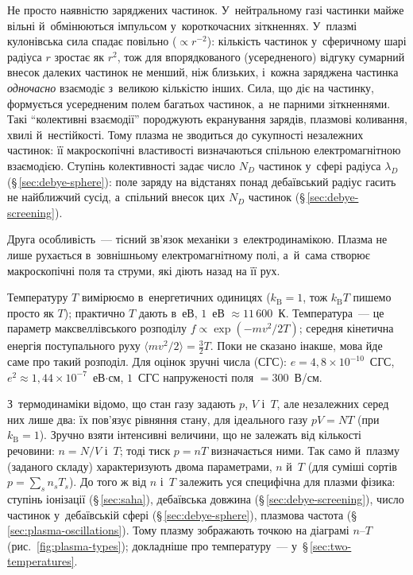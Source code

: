  Не просто наявністю заряджених
частинок. У~нейтральному газі частинки майже вільні й~обмінюються імпульсом
у~короткочасних зіткненнях. У~плазмі кулонівська сила спадає повільно ($\propto r^{-2}$): кількість частинок у~сферичному шарі
радіуса $r$ зростає як $r^2$, тож для впорядкованого (усередненого) відгуку сумарний внесок далеких частинок не менший, ніж близьких,
і~кожна заряджена частинка \emph{одночасно} взаємодіє з~великою кількістю інших. Сила,
що діє на частинку, формується усередненим полем багатьох частинок, а~не парними
зіткненнями. Такі \enquote{колективні взаємодії} породжують екранування зарядів, плазмові
коливання, хвилі й~нестійкості. Тому плазма не зводиться до сукупності незалежних
частинок: її макроскопічні властивості визначаються спільною електромагнітною взаємодією.
Ступінь колективності задає число $N_D$ частинок у~сфері радіуса $\lambda_D$
(§\,\ref{sec:debye-sphere}): поле заряду на відстанях понад дебаївський радіус гасить не найближчий
сусід, а~спільний внесок цих $N_D$ частинок (§\,\ref{sec:debye-screening}).

Друга особливість~--- тісний зв'язок механіки з~електродинамікою. Плазма не лише рухається
в~зовнішньому електромагнітному полі, а~й~сама створює макроскопічні поля та струми, які
діють назад на її рух.

\begin{Theory}
Температуру $T$ вимірюємо в~енергетичних одиницях ($k_{\mathrm B}=1$, тож $k_{\mathrm B}T$ пишемо просто
як $T$); практично $T$ дають в~еВ, $1$~еВ $\approx11\,600$~К. Температура~--- це параметр
максвеллівського розподілу $f\propto\exp(-mv^2/2T)$; середня кінетична енергія поступального руху
$\langle mv^2/2\rangle=\tfrac32T$. Поки не сказано інакше, мова йде саме про такий розподіл.
Для оцінок зручні числа (СГС): $e=4{,}8\times10^{-10}$~СГС, $e^2\approx1{,}44\times10^{-7}$~еВ$\cdot$см,
$1$~СГС напруженості поля $=300$~В/см.
\end{Theory}

З~термодинаміки відомо, що стан газу задають $p$, $V$ і~$T$, але незалежних серед них лише два: їх пов'язує рівняння стану, для ідеального газу $pV=NT$ (при $k_{\mathrm B}=1$). Зручно взяти інтенсивні величини, що не залежать від кількості речовини: $n=N/V$ і~$T$; тоді тиск $p=nT$ визначається ними. Так само й~плазму (заданого складу) характеризують двома параметрами, $n$ й~$T$ (для суміші сортів $p=\sum_s n_sT_s$). До того ж від $n$ і~$T$ залежить уся специфічна для плазми фізика: ступінь іонізації (§\,\ref{sec:saha}), дебаївська довжина (§\,\ref{sec:debye-screening}), число частинок у~дебаївській сфері (§\,\ref{sec:debye-sphere}), плазмова частота (§\,\ref{sec:plasma-oscillations}). Тому плазму зображають точкою на діаграмі $n$--$T$ (рис.~\ref{fig:plasma-types}); докладніше про температуру~--- у~§\,\ref{sec:two-temperatures}.

